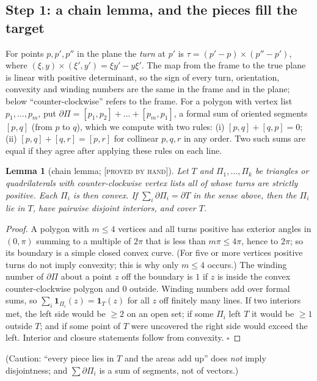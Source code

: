 \documentclass[11pt,reqno]{amsart}
\theoremstyle{plain}
\newtheorem{lemma}[theorem]{Lemma}
\theoremstyle{definition}
\newcommand{\lab}[1]{\textup{[\textsc{#1}]}}
\newcommand{\PH}{\lab{proved by hand}}
\begin{document}
\subsection{Step 1: a chain lemma, and the pieces fill the target}\label{sub:cover}
For points $p,p',p''$ in the plane the \emph{turn} at $p'$ is $\tau=(p'-p)\times(p''-p')$, where $(\xi,y)\times(\xi',y')=\xi y'-y\xi'$. The map from the frame to the true plane is linear with positive determinant, so the sign of every turn, orientation, convexity and winding numbers are the same in the frame and in the plane; below ``counter-clockwise'' refers to the frame. For a polygon with vertex list $p_1,\dots,p_m$, put $\partial\Pi=[p_1,p_2]+\dots+[p_m,p_1]$, a formal sum of oriented segments $[p,q]$ (from $p$ to $q$), which we compute with two rules: (i) $[p,q]+[q,p]=0$; (ii) $[p,q]+[q,r]=[p,r]$ for collinear $p,q,r$ in any order. Two such sums are equal if they agree after applying these rules on each line.
\begin{lemma}[chain lemma; \PH{}]\label{lem:chain}
Let $T$ and $\Pi_1,\dots,\Pi_k$ be triangles or quadrilaterals with counter-clockwise vertex lists all of whose turns are strictly positive. Each $\Pi_i$ is then convex. If $\sum_i\partial\Pi_i=\partial T$ in the sense above, then the $\Pi_i$ lie in $T$, have pairwise disjoint interiors, and cover $T$.
\end{lemma}
\begin{proof}
A polygon with $m\le4$ vertices and all turns positive has exterior angles in $(0,\pi)$ summing to a multiple of $2\pi$ that is less than $m\pi\le4\pi$, hence to $2\pi$; so its boundary is a simple closed convex curve. (For five or more vertices positive turns do not imply convexity; this is why only $m\le4$ occurs.) The winding number of $\partial\Pi$ about a point $z$ off the boundary is $1$ if $z$ is inside the convex counter-clockwise polygon and $0$ outside. Winding numbers add over formal sums, so $\sum_i\mathbf 1_{\Pi_i}(z)=\mathbf 1_T(z)$ for all $z$ off finitely many lines. If two interiors met, the left side would be $\ge2$ on an open set; if some $\Pi_i$ left $T$ it would be $\ge1$ outside $T$; and if some point of $T$ were uncovered the right side would exceed the left. Interior and closure statements follow from convexity. $\square$
\end{proof}
(Caution: ``every piece lies in $T$ and the areas add up'' does \emph{not} imply disjointness; and $\sum\partial\Pi_i$ is a sum of segments, not of vectors.)
\end{document}
